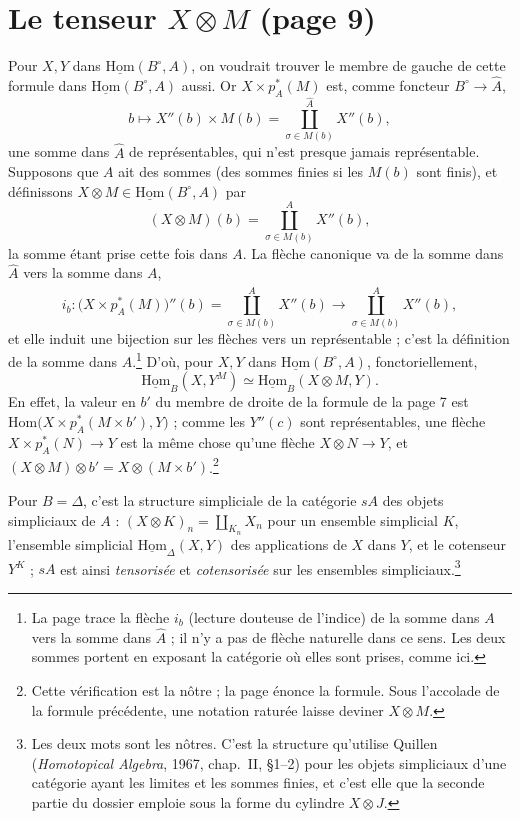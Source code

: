 \documentclass[11pt,a4paper]{article}
\begin{document}
\section*{Le tenseur $X \otimes M$ (page 9)}

Pour $X, Y$ dans $\underline{\mathrm{Hom}}(B^{\circ}, A)$, on voudrait
trouver le membre de gauche de cette formule dans
$\underline{\mathrm{Hom}}(B^{\circ}, A)$ aussi. Or $X \times p_{A}^{*}(M)$ est,
comme foncteur $B^{\circ} \to \widehat{A}$,
\[
b \longmapsto X''(b) \times M(b) = \coprod^{\widehat{A}}_{\sigma \in M(b)}
X''(b),
\]
une somme dans $\widehat{A}$ de représentables, qui n'est presque jamais
représentable. Supposons que $A$ ait des sommes (des sommes finies si les
$M(b)$ sont finis), et définissons $X \otimes M \in
\underline{\mathrm{Hom}}(B^{\circ}, A)$ par
\[
(X \otimes M)(b) = \coprod^{A}_{\sigma \in M(b)} X''(b),
\]
la somme étant prise cette fois dans $A$. La flèche canonique va de la somme
dans $\widehat{A}$ vers la somme dans $A$,
\[
i_{b} : \bigl(X \times p_{A}^{*}(M)\bigr)''(b) =
\coprod^{\widehat{A}}_{\sigma \in M(b)} X''(b) \longrightarrow
\coprod^{A}_{\sigma \in M(b)} X''(b),
\]
et elle induit une bijection sur les flèches vers un représentable ; c'est la
définition de la somme dans $A$.\footnote{La page trace la flèche
$i_{b}$ (lecture douteuse de l'indice) de la somme dans $A$ vers la somme dans
$\widehat{A}$ ; il n'y a pas de flèche naturelle dans ce sens. Les deux sommes
portent en exposant la catégorie où elles sont prises, comme ici.} D'où, pour
$X, Y$ dans $\underline{\mathrm{Hom}}(B^{\circ}, A)$, fonctoriellement,
\[
\underline{\mathrm{Hom}}_{B}(X, Y^{M}) \simeq \underline{\mathrm{Hom}}_{B}(X
\otimes M, Y).
\]
En effet, la valeur en $b'$ du membre de droite de la formule
de la page 7 est $\mathrm{Hom}\bigl(X \times p_{A}^{*}(M \times b'),
Y\bigr)$ ; comme les $Y''(c)$ sont représentables, une flèche
$X \times p_{A}^{*}(N) \to Y$ est la même chose qu'une flèche $X \otimes N \to
Y$, et $(X \otimes M) \otimes b' = X \otimes (M \times b')$.\footnote{Cette
vérification est la nôtre ; la page énonce la formule. Sous l'accolade de la
formule précédente, une notation raturée laisse deviner $X \otimes M$.}

Pour $B = \Delta$, c'est la structure simpliciale de la catégorie $sA$ des
objets simpliciaux de $A$ : $(X \otimes K)_{n} = \coprod_{K_{n}} X_{n}$ pour
un ensemble simplicial $K$, l'ensemble simplicial
$\underline{\mathrm{Hom}}_{\Delta}(X, Y)$ des applications de $X$ dans $Y$, et
le cotenseur $Y^{K}$ ; $sA$ est ainsi \emph{tensorisée} et
\emph{cotensorisée} sur les ensembles simpliciaux.\footnote{Les deux mots sont
les nôtres. C'est la structure qu'utilise Quillen (\emph{Homotopical Algebra},
1967, chap.~II, §1--2) pour les objets simpliciaux d'une catégorie ayant les
limites et les sommes finies, et c'est elle que la seconde partie du dossier
emploie sous la forme du cylindre $X \otimes J$.}
\end{document}

